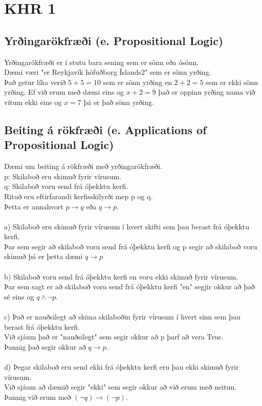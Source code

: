 \section{KHR 1}
\subsection{Yrðingarökfræði (e. Propositional Logic)}
Yrðingarökfræði er í stutu bara sening sem er sönn eða ósönn.\\
Dæmi væri "er Reykjavík höfuðborg Íslands2" sem er sönn yrðing.\\
Það getur líka verið $5 + 5 = 10$ sem er sönn yrðing en $2 + 2 = 5$ sem er ekki sönn yrðing. 
Ef við erum með dæmi eins og $x + 2 = 9$ það er oppinn yrðing nama við vitum ekki eins og $x = 7$ þá er það sönn yrðing.\\
\subsection{Beiting á rökfræði (e. Applications of Propositional Logic)}
Dæmi um beiting á rökfræði með yrðingarökfræði.\\
p: Skilaboð eru skimuð fyrir vírusum.\\
q: Skilaboð voru send frá óþekktu kerfi.\\
Rituð eru eftirfarandi kerfisskilyrði mep p og q.\\
Þetta er annahvort $p \to q$ eða $q \to p$.\\
\\
a) Skilaboð eru skimuð fyrir vírusum í hvert skifti sem þau berast frá óþekktu kerfi.\\
Þar sem segir að skilaboð voru send frá óþekktu kerfi og p segir að skilaboð voru skimuð þá er þetta dæmi $q \to p$\\
\\
b) Skilaboð voru send frá óþekktu kerfi en voru ekki skimuð fyrir vírusum.\\
Þar sem sagt er að skilaboð voru send frá óþekktu kerfi "en" segjir okkur að það sé eins og $q \wedge \lnot p$.\\
\\
c) Það er nauðsilegt að skima skilaboðin fyrir vírusum í hvert sinn sem þau berast frá óþekktu kerfi.\\
Við sjáum það er "nauðsilegt" sem segir okkur að p þarf að vera True.\\
Þannig það segir okkur að $q \to p$.\\
\\
d) Þegar skilaboð eru send ekki frá óþekktu kerfi eru þau ekki skimuð fyrir vírusum.\\
Við sjáum að dæmið segir "ekki" sem segir okkur að við erum með neitun.\\
Þannig við erum með $(\lnot q) \to (\lnot p)$.
\newpage
